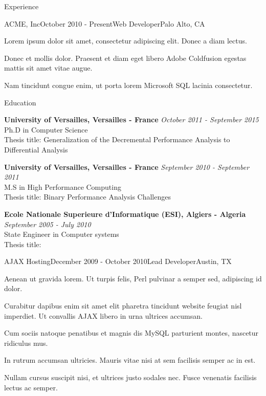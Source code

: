 \documentclass{resume} %
\begin{document}
\begin{rSection}{Experience}
\begin{rSubsection}{ACME, Inc}{October 2010 - Present}{Web Developer}{Palo Alto, CA}
\item Lorem ipsum dolor sit amet, consectetur adipiscing elit. Donec a diam lectus.
\item Donec et mollis dolor. Praesent et diam eget libero Adobe Coldfusion egestas mattis sit amet vitae augue.
\item Nam tincidunt congue enim, ut porta lorem Microsoft SQL lacinia consectetur.
\end{rSubsection}


\begin{rSection}{Education}

{\bf University of Versailles, Versailles - France} \hfill {\em October 2011 - September 2015} \\ 
Ph.D in Computer Science\\
Thesis title: Generalization of the Decremental Performance Analysis to Differential Analysis

{\bf University of Versailles, Versailles - France} \hfill {\em September 2010 - September 2011} \\ 
M.S in High Performance Computing\\
Thesis title: Binary Performance Analysis Challenges

{\bf Ecole Nationale Superieure d'Informatique (ESI), Algiers - Algeria} \hfill {\em September 2005 - July 2010} \\ 
State Engineer in Computer systems\\
Thesis title: 
\end{rSection}



\begin{rSubsection}{AJAX Hosting}{December 2009 - October 2010}{Lead Developer}{Austin, TX}
\item Aenean ut gravida lorem. Ut turpis felis, Perl pulvinar a semper sed, adipiscing id dolor.
\item Curabitur dapibus enim sit amet elit pharetra tincidunt website feugiat nisl imperdiet. Ut convallis AJAX libero in urna ultrices accumsan.
\item Cum sociis natoque penatibus et magnis dis MySQL parturient montes, nascetur ridiculus mus.
\item In rutrum accumsan ultricies. Mauris vitae nisi at sem facilisis semper ac in est.
\item Nullam cursus suscipit nisi, et ultrices justo sodales nec. Fusce venenatis facilisis lectus ac semper.
\end{rSubsection}


\end{rSection}
\end{document}

